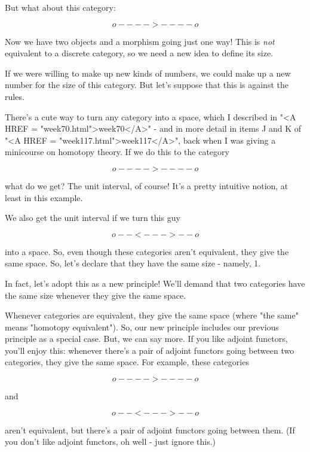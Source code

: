 But what about this category:


$$

                     o---->----o
$$
    
Now we have two objects and a morphism going just one way!  
This is \emph{not} equivalent to a discrete category, so we need 
a new idea to define its size.  

If we were willing to make up new kinds of numbers, we could
make up a new number for the size of this category.  But let's
suppose that this is against the rules.  

There's a cute way to turn any category into a space, which I
described in "<A HREF = "week70.html">week70</A>" - and in
more detail in items J and K of "<A HREF =
"week117.html">week117</A>", back when I was giving a minicourse
on homotopy theory.  If we do this to the category


$$

                     o---->----o
$$
    
what do we get?  The unit interval, of course!   It's a pretty
intuitive notion, at least in this example.  

We also get the unit interval if we turn this guy 


$$

                     o--<--->--o
$$
    
into a space.  So, even though these categories aren't equivalent,
they give the same space.  So, let's declare that they have the 
same size - namely, 1.

In fact, let's adopt this as a new principle!   We'll demand that 
two categories have the same size whenever they give the same space.

Whenever categories are equivalent, they give the same space (where
"the same" means "homotopy equivalent").  So, our
new principle includes our previous principle as a special case.  But,
we can say more.  If you like adjoint functors, you'll enjoy this:
whenever there's a pair of adjoint functors going between two
categories, they give the same space.  For example, these categories


$$

                     o---->----o
$$
    
and


$$

                     o--<--->--o
$$
    
aren't equivalent, but there's a pair of adjoint functors going between 
them.  (If you don't like adjoint functors, oh well - just ignore this.)

